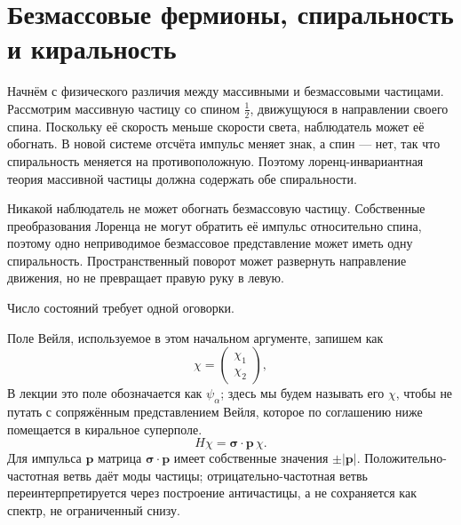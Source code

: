 \section{Безмассовые фермионы, спиральность и киральность}

Начнём с физического различия между массивными и безмассовыми частицами. Рассмотрим массивную частицу со спином \(\tfrac12\), движущуюся в направлении своего спина. Поскольку её скорость меньше скорости света, наблюдатель может её обогнать. В новой системе отсчёта импульс меняет знак, а спин — нет, так что спиральность меняется на противоположную. Поэтому лоренц-инвариантная теория массивной частицы должна содержать обе спиральности.

Никакой наблюдатель не может обогнать безмассовую частицу. Собственные преобразования Лоренца не могут обратить её импульс относительно спина, поэтому одно неприводимое безмассовое представление может иметь одну спиральность. Пространственный поворот может развернуть направление движения, но не превращает правую руку в левую.

\begin{classroomqa}\end{classroomqa}

Число состояний требует одной оговорки.

Поле Вейля, используемое в этом начальном аргументе, запишем как \begin{equation}
\chi=
\begin{pmatrix}
\chi_1\\
\chi_2
\end{pmatrix},
\end{equation} В лекции это поле обозначается как \(\psi_\alpha\); здесь мы будем называть его \(\chi\), чтобы не путать с сопряжённым представлением Вейля, которое по соглашению ниже помещается в киральное суперполе. \begin{equation}
H\chi=\boldsymbol{\sigma}\cdot\mathbf p\,\chi.
\label{eq:l8-weyl-hamiltonian}
\end{equation} Для импульса \(\mathbf p\) матрица \(\boldsymbol{\sigma}\cdot\mathbf p\) имеет собственные значения \(\pm|\mathbf p|\). Положительно-частотная ветвь даёт моды частицы; отрицательно-частотная ветвь переинтерпретируется через построение античастицы, а не сохраняется как спектр, не ограниченный снизу.

